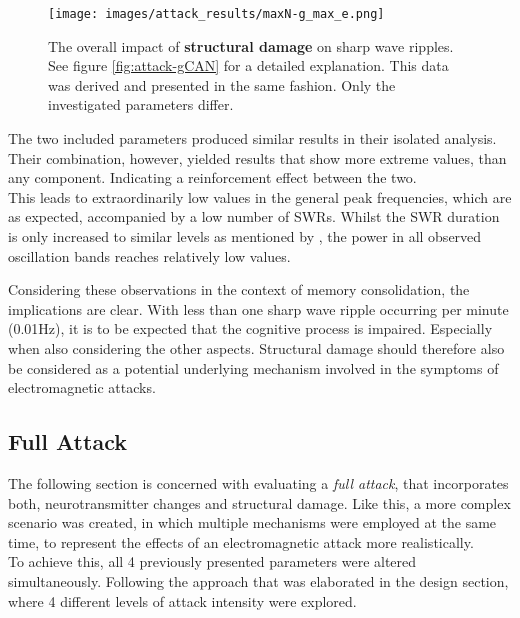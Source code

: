         \begin{figure}[htbp]
            \centering
            \texttt{[image: images/attack\_results/maxN-g\_max\_e.png]}
            \caption{The overall impact of \textbf{structural damage} on sharp wave ripples. See figure \ref{fig:attack-gCAN} for a detailed explanation. This data was derived and presented in the same fashion. Only the investigated parameters differ.}
            \label{fig:attack-structural_damage}
        \end{figure}
        The two included parameters produced similar results in their isolated analysis. Their combination, however, yielded results that show more extreme values, than any component. Indicating a reinforcement effect between the two.\\
        This leads to extraordinarily low values in the general peak frequencies, which are as expected, accompanied by a low number of SWRs. Whilst the SWR duration is only increased to similar levels as mentioned by \textcite{AmelieAussel.2020}, the power in all observed oscillation bands reaches relatively low values.

        Considering these observations in the context of memory consolidation, the implications are clear. With less than one sharp wave ripple occurring per minute (0.01Hz), it is to be expected that the cognitive process is impaired. Especially when also considering the other aspects. Structural damage should therefore also be considered as a potential underlying mechanism involved in the symptoms of electromagnetic attacks.


    \subsection{Full Attack}
    The following section is concerned with evaluating a \textit{full attack}, that incorporates both, neurotransmitter changes and structural damage. Like this, a more complex scenario was created, in which multiple mechanisms were employed at the same time, to represent the effects of an electromagnetic attack more realistically.\\
    To achieve this, all 4 previously presented parameters were altered simultaneously. Following the approach that was elaborated in the design section, where 4 different levels of attack intensity were explored.\\

